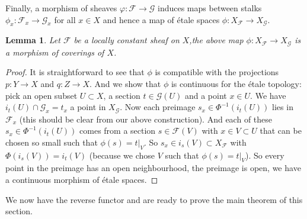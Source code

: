 \documentclass{article}
\theoremstyle{plain}
\newtheorem{lemma}[theorem]{Lemma}
\theoremstyle{definition}
\begin{document}
\noindent Finally, a morphism of sheaves $\varphi : \mathcal{F} \rightarrow \mathcal{G}$ induces maps between stalks $\phi_x:\mathcal{F}_x \rightarrow \mathcal{G}_x$ for all $x\in X$ and hence a map of \'etale spaces $\phi: X_{\mathcal{F}} \rightarrow X_{\mathcal{G}}$.

\begin{lemma}
\label{morphism_of_etal_space}
    Let $\mathcal{F}$ be a locally constant sheaf on $X$,the above map $\phi : X_{\mathcal{F}} \rightarrow X_{\mathcal{G}}$ is a morphism of coverings of $X$.
\end{lemma}
\begin{proof}
    It is straightforward to see that $\phi$ is compatible with the projections $p:Y\rightarrow X$ and $q:Z\rightarrow X$.
    And we show that $\phi$ is continuous for the \'etale topology:
    pick an open subset $U\subset X$, a section $t\in\mathcal{G}(U)$ and a point $x\in U$.
    We have $i_t(U) \cap \mathcal{G}_x = t_x$ a point in $X_{\mathcal{G}}$.
    Now each preimage $s_x \in \Phi^{-1}(i_t(U))$ lies in $\mathcal{F}_x$ (this should be clear from our above construction).
    And each of these $s_x\in\Phi^{-1}(i_t(U))$ comes from a section $s\in\mathcal{F}(V)$ with $x\in V\subset U$ that can be chosen so small such that $\phi(s) = t\vert_V$.
    So $s_x\in i_s(V)\subset X_{\mathcal{F}}$ with $\Phi(i_s(V)) = i_t(V)$ (because we chose $V$ such that $\phi(s) = t\vert_V$).
    So every point in the preimage has an open neighbourhood, the preimage is open, we have a continuous morphism of \'etale spaces.
\end{proof}

\noindent We now have the reverse functor and are ready to prove the main theorem of this section.
\end{document}
